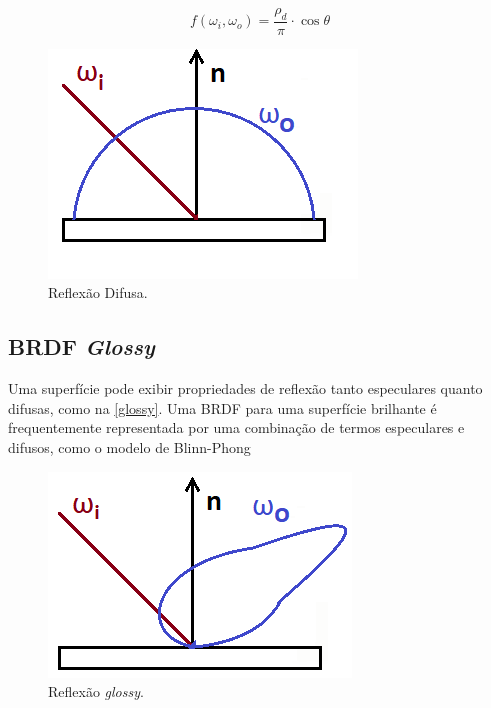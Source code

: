 \documentclass[english, 
               brazil, 
               bsc] %
               {dcomp-abntex2}
\begin{document}
\begin{equation} \label{eq-diffuse}
f(\omega_i, \omega_o) = \frac{\rho_d}{\pi} \cdot \cos \theta
\end{equation}

\begin{figure}[H]
	\caption{\label{diffuse} \small Reflexão Difusa. }
	\begin{center}
	    \includegraphics[scale=0.5]{./Imagens/diffuse-2d.png}
	\end{center}
\end{figure}

\subsection{BRDF \textit{Glossy}}
Uma superfície pode exibir propriedades de reflexão tanto especulares quanto difusas, como na \autoref{glossy}. Uma BRDF para uma superfície brilhante é frequentemente representada por uma combinação de termos especulares e difusos, como o modelo de Blinn-Phong \cite{blinn_phong}

\begin{figure}[H]
  \caption{\label{glossy} \small Reflexão \textit{glossy}. }
	\begin{center}
	    \includegraphics[scale=0.5]{./Imagens/glossy-2d.png}
	\end{center}
\end{figure}
\end{document}
